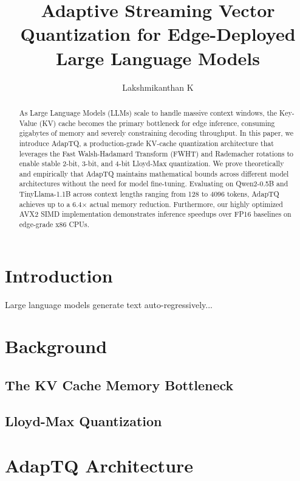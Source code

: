 \documentclass[sigconf]{acmart}
\begin{document}
\title{Adaptive Streaming Vector Quantization for Edge-Deployed Large Language Models}

\author{Lakshmikanthan K}

\begin{abstract}
As Large Language Models (LLMs) scale to handle massive context windows, the Key-Value (KV) cache becomes the primary bottleneck for edge inference, consuming gigabytes of memory and severely constraining decoding throughput. In this paper, we introduce AdapTQ, a production-grade KV-cache quantization architecture that leverages the Fast Walsh-Hadamard Transform (FWHT) and Rademacher rotations to enable stable 2-bit, 3-bit, and 4-bit Lloyd-Max quantization. We prove theoretically and empirically that AdapTQ maintains mathematical bounds across different model architectures without the need for model fine-tuning. Evaluating on Qwen2-0.5B and TinyLlama-1.1B across context lengths ranging from 128 to 4096 tokens, AdapTQ achieves up to a 6.4$\times$ actual memory reduction. Furthermore, our highly optimized AVX2 SIMD implementation demonstrates inference speedups over FP16 baselines on edge-grade x86 CPUs.
\end{abstract}

\maketitle

\section{Introduction}
Large language models generate text auto-regressively...

\section{Background}
\subsection{The KV Cache Memory Bottleneck}
\subsection{Lloyd-Max Quantization}

\section{AdapTQ Architecture}
\end{document}
